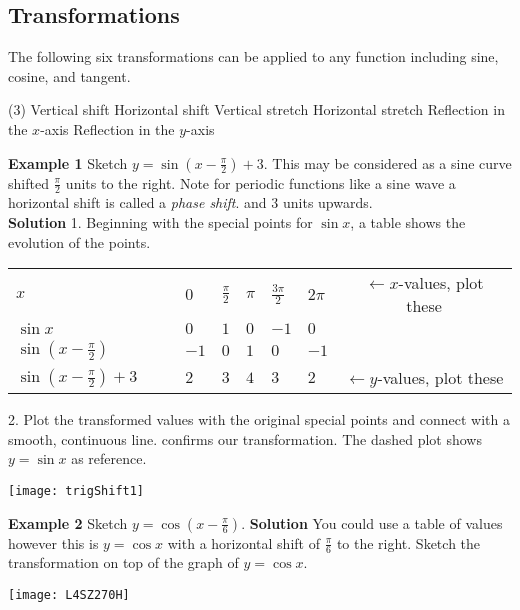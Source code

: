 \subsection{Transformations}
The following six transformations can be applied to any function including sine, cosine, and tangent. 
\begin{tasks}[style=itemize](3)
\task Vertical shift 
\task Horizontal shift 
\task Vertical stretch 
\task Horizontal stretch 
\task Reflection in the $x$-axis 
\task Reflection in the $y$-axis 
\end{tasks}

\textbf{Example 1} Sketch $y =\sin  \left (x -\frac{\pi }{2}\right ) +3$. This may be considered as a sine curve shifted $\frac{\pi }{2}$ units to the right. Note for periodic functions like a sine wave a horizontal shift is called a \textit{phase shift}. and $3$ units upwards.\\ 
\textbf{Solution} 1. Beginning with the special points for $\sin x$, a table shows the evolution of the points. \\
\begin{tabular}{llllllc}\cmidrule{1-6}
	$x$  & $0$  & $\frac{\pi }{2}$  & $\pi $  & $\frac{3 \pi }{2}$  & $2 \pi $ & $\leftarrow x$-values, plot these \\
	\cmidrule{1-6}
	$\sin  x$  & $0$  & $1$  & $0$  & $ -1$  & $0$ & \\
	\cmidrule{1-6}
	$\sin  \left (x -\frac{\pi }{2}\right )$  & $ -1$  & $0$  & $1$  & $0$  & $ -1$&  \\
	\cmidrule{1-6}
	$\sin  \left (x -\frac{\pi }{2}\right ) +3\qquad$  & $2$  & $3$  & $4$  & $3$  & $2$&$\leftarrow y$-values, plot these  \\
	\cmidrule{1-6}
\end{tabular}

2. Plot the transformed values with the original special points and connect with a smooth, continuous line. \Desmos confirms our transformation. The dashed plot shows $y=\sin x$ as reference.\\
\begin{center}
\texttt{[image: trigShift1]}
\end{center}


\textbf{Example 2} Sketch $y =\cos  (x -\frac{\pi }{6})$.
\textbf{Solution} You could use a table of values however this is $y =\cos  x$ with a horizontal shift of $\frac{\pi }{6}$ to the right. Sketch the transformation on top of the graph of $y =\cos  x $.
\begin{center}
\texttt{[image: L4SZ270H]}
\end{center}

